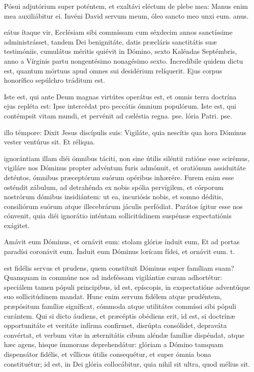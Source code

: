 \documentclass[fontsize=9pt,paper=A6,twoside,BCOR=1mm,DIV=22,headinclude]{scrarticle}
\begin{document}
\begin{multicols}{2}
\R Pósui adjutórium super poténtem, et exaltávi eléctum de plebe mea: \red{*} Manus enim mea auxiliábitur ei.
\V Invéni David servum meum, óleo sancto meo unxi eum. anus.

eátus ítaque vir, Ecclésiam sibi commíssam cum séxdecim annos sanctíssime administrásset, tandem Dei benignitáte, datis præcláris sanctitátis suæ testimóniis, cumulátus méritis quiévit in Dómino, sexto Kaléndas Septémbris, anno a Vírginis partu nongentésimo nonagésimo sexto. Incredíbile quidem dictu est, quantum mórtuus apud omnes sui desidérium relíquerit. Ejus corpus honorífico sepúlchro tráditum est.

\R Iste est, qui ante Deum magnas virtútes operátus est, et omnis terra doctrína ejus repléta est: \red{*} Ipse intercédat pro peccátis ómnium populórum.
\V Iste est, qui contémpsit vitam mundi, et pervénit ad cæléstia regna. pse. lória Patri. pse.

 illo témpore: Dixit Jesus discípulis suis: Vigiláte, quia nescítis qua hora Dóminus vester ventúrus sit. Et réliqua.

 ignorántiam illam diéi ómnibus táciti, non sine útilis siléntii ratióne esse scirémus, vigiláre nos Dóminus propter advéntum furis admónuit, et oratiónum assiduitáte deténtos, ómnibus præceptórum suórum opéribus inhærére. Furem enim esse osténdit zábulum, ad detrahénda ex nobis spólia pervígilem, et córporum nostrórum dómibus insidiántem: ut ea, incuriósis nobis, et somno déditis, consiliórum suórum atque illecebrárum jáculis perfódiat. Parátos ígitur esse nos cónvenit, quia diéi ignorátio inténtam sollicitúdinem suspénsæ expectatiónis exágitet.

\R Amávit eum Dóminus, et ornávit eum: stolam glóriæ índuit eum, \red{*} Et ad portas paradísi coronávit eum.
\V Índuit eum Dóminus lorícam fídei, et ornávit eum. t.

 est fidélis servus et prudens, quem constítuit Dóminus super famíliam suam? Quamquam in commúne nos ad indeféssam vigilántiæ curam adhortétur: speciálem tamen pópuli principibus, id est, epíscopis, in exspectatióne adventúque suo sollicitúdinem mandat. Hunc enim servum fidélem atque prudéntem, præpósitum famíliæ signíficat, cómmoda atque utilitátes commíssi sibi pópuli curántem. Qui si dicto áudiens, et præcéptis obédiens erit, id est, si doctrínæ opportunitáte et veritáte infírma confirmet, disrúpta consólidet, depraváta convértat, et verbum vitæ in æternitátis cibum aléndæ famíliæ dispéndat, atque hæc agens, hisque ímmorans deprehendátur: glóriam a Dómino tamquam dispensátor fidélis, et víllicus útilis consequétur, et super ómnia bona constituétur; id est, in Dei glória collocábitur, quia nihil sit ultra, quod mélius sit.


\end{multicols}
\end{document}
